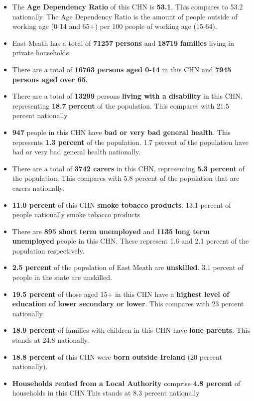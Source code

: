 \documentclass{article}
\begin{document}
\begin{itemize}

\item The \textbf{Age Dependency Ratio} of this CHN is  \textbf{53.1}. This compares to 53.2 nationally. The Age Dependency Ratio is the amount of people outside of working age (0-14 and 65+) per 100 people of working age (15-64). 

\item East Meath has a total of \textbf{\num{71257}} \textbf{persons} and  \textbf{\num{18719}} \textbf{families} living in private households.

\item There are a total of \textbf{\num{16763} persons aged 0-14} in this CHN and \textbf{\num{7945} persons aged over 65.} 

\item There are a total of \textbf{\num{13299}} persons \textbf{living with a disability} in this CHN, representing \textbf{18.7 percent} of the population. This compares with  21.5 percent nationally

\item \textbf{\num{947}} people in this CHN have \textbf{bad or very bad general health}. This represents \textbf{1.3 percent} of the population. 1.7 percent of the population have bad or very bad general health nationally. 

\item There are a total of \textbf{\num{3742} carers} in this CHN, representing \textbf{5.3 percent} of the population. This compares with 5.8 percent of the population that are carers nationally. 

\item \textbf{11.0 percent} of this CHN \textbf{smoke tobacco products}. 13.1 percent of people nationally smoke tobacco products

\item There are \textbf{\num{895} short term unemployed} and \textbf{\num{1135} long term unemployed} people in this CHN. These represent 1.6 and 2.1 percent of the population respectively.

\item  \textbf{2.5 percent} of the population of East Meath are \textbf{unskilled}. 3.1 percent of people in the state are unskilled.

\item \textbf{19.5 percent} of those aged 15+ in this CHN have a \textbf{highest level of education of lower secondary or lower}. This compares with 23 percent nationally. 

\item \textbf{18.9 percent} of families with children in this CHN have \textbf{lone parents}. This stands at 24.8 nationally.

\item \textbf{18.8 percent} of this CHN were \textbf{born outside Ireland} (20 percent nationally).

\item \textbf{Households rented from a Local Authority} comprise \textbf{4.8 percent} of households in this CHN.This stands at 8.3 percent nationally

\end{itemize}
\end{document}
